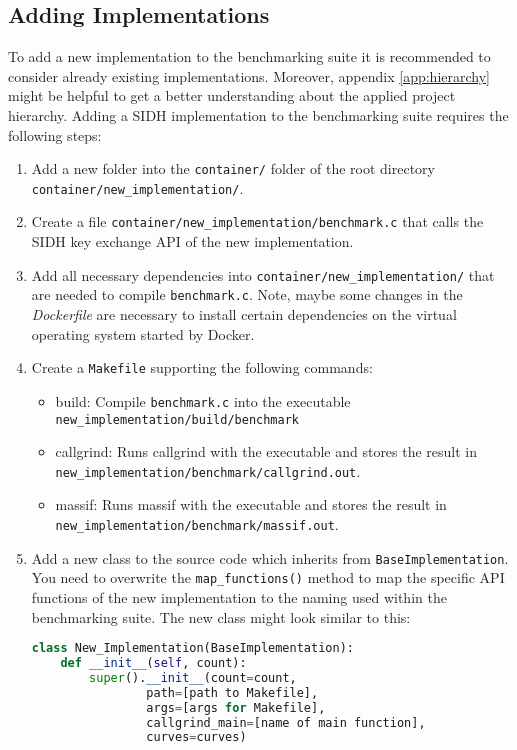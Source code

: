 \subsection{Adding Implementations}\label{sec:benchmarks_details_add}
To add a new implementation to the benchmarking suite it is recommended to consider already existing implementations. Moreover, appendix \ref{app:hierarchy} might be helpful to get a better understanding about the applied project hierarchy. Adding a \gls{SIDH} implementation to the benchmarking suite requires the following steps:
\begin{enumerate}
\itemsep0em 
\item Add a new folder into the \texttt{container/} folder of the root directory \\ \texttt{container/new\_implementation/}.
\item Create a file \texttt{container/new\_implementation/benchmark.c} that calls the \gls{SIDH} key exchange API of the new implementation.
\item Add all necessary dependencies into \texttt{container/new\_implementation/} that are needed to compile \texttt{benchmark.c}. Note, maybe some changes in the \textit{Dockerfile} are necessary to install certain dependencies on the virtual operating system started by Docker.
\item Create a \texttt{Makefile} supporting the following commands:
	\begin{itemize}
		\item build: Compile \texttt{benchmark.c} into the executable \\ \texttt{new\_implementation/build/benchmark}
		\item callgrind: Runs callgrind with the executable and stores the result in\\ \texttt{new\_implementation/benchmark/callgrind.out}.
		\item massif: Runs massif with the executable and stores the result in\\ \texttt{new\_implementation/benchmark/massif.out}.
	\end{itemize}
\item Add a new class to the source code which inherits from \texttt{BaseImplementation}. You need to overwrite the \texttt{map\_functions()} method to map the specific API functions of the new implementation to the naming used within the benchmarking suite. The new class might look similar to this:

\begin{lstlisting}[language=Python]
class New_Implementation(BaseImplementation):
    def __init__(self, count):
        super().__init__(count=count,
				path=[path to Makefile], 
				args=[args for Makefile],
				callgrind_main=[name of main function],
				curves=curves)


\end{lstlisting}
\end{enumerate}
